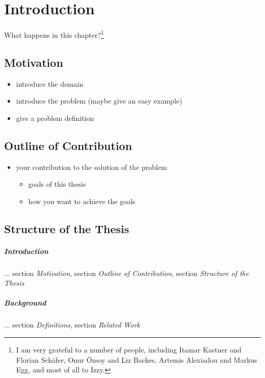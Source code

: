 \chapter{Introduction}\label{introduction}

What happens in this chapter?\footnote{I am very grateful to a number of people, including Itamar Kastner and Florian Schäfer, Onur Özsoy and Liz Backes, Artemis Alexiadou and Markus Egg, and most of all to Izzy.}

\section{Motivation}

\begin{itemize}
\item introduce the domain
\item introduce the problem (maybe give an easy example)
\item give a problem definition
\end{itemize}

\section{Outline of Contribution}

\begin{itemize}
\item your contribution to the solution of the problem
\begin{itemize}
  \item goals of this thesis
  \item how you want to achieve the goals
\end{itemize}
\end{itemize}

\section{Structure of the Thesis}

\paragraph{Introduction} ... section \textit{Motivation}, section \textit{Outline of Contribution}, section \textit{Structure of the Thesis}

\paragraph{Background} ... section \textit{Definitions}, section \textit{Related Work}

